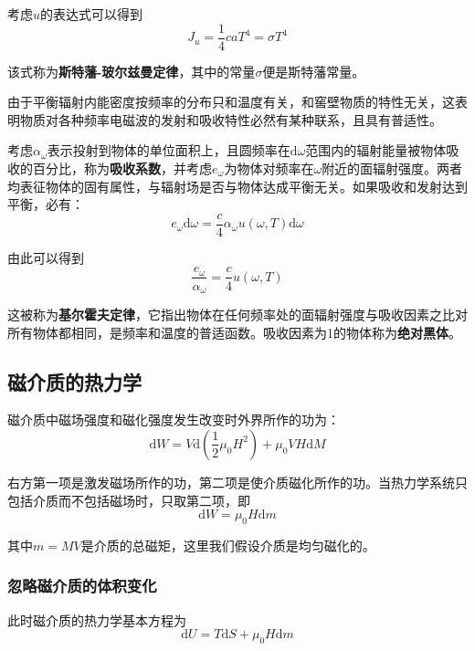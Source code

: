 \documentclass[UTF8]{ctexart}
\newcommand{\dif}{\mathrm{d}}
\begin{document}
	考虑$ u $的表达式可以得到
	\begin{equation}
		J_{u} = \frac{1}{4} c a T^{4} = \sigma T^{4}
	\end{equation}
	
\noindent 该式称为\textbf{斯特藩-玻尔兹曼定律}，其中的常量$ \sigma $便是斯特藩常量。

	由于平衡辐射内能密度按频率的分布只和温度有关，和窖壁物质的特性无关，这表明物质对各种频率电磁波的发射和吸收特性必然有某种联系，且具有普适性。
	
	考虑$ \alpha_{\omega} $表示投射到物体的单位面积上，且圆频率在$ \dif \omega $范围内的辐射能量被物体吸收的百分比，称为\textbf{吸收系数}，并考虑$ e_{\omega} $为物体对频率在$ \omega $附近的面辐射强度。两者均表征物体的固有属性，与辐射场是否与物体达成平衡无关。如果吸收和发射达到平衡，必有：
	\begin{equation}
	e_{\omega} \mathrm{d} \omega=\frac{c}{4} \alpha_{\omega} u(\omega, T) \mathrm{d} \omega
	\end{equation}
	
\noindent 由此可以得到
\begin{equation}
\frac{e_{\omega}}{\alpha_{\omega}}=\frac{c}{4} u(\omega, T)
\end{equation}

\noindent 这被称为\textbf{基尔霍夫定律}，它指出物体在任何频率处的面辐射强度与吸收因素之比对所有物体都相同，是频率和温度的普适函数。吸收因素为1的物体称为\textbf{绝对黑体}。

	\subsection{磁介质的热力学}
	磁介质中磁场强度和磁化强度发生改变时外界所作的功为：
	\begin{equation}
	\mathrm{d} W=V \mathrm{d}\left(\frac{1}{2} \mu_{0} H^{2}\right)+\mu_{0} V H \mathrm{d} M
	\end{equation}
	
\noindent 右方第一项是激发磁场所作的功，第二项是使介质磁化所作的功。当热力学系统只包括介质而不包括磁场时，只取第二项，即
\begin{equation}
\mathrm{d} W=\mu_{0} H \mathrm{d} m\label{equ_mag1}
\end{equation}

\noindent 其中$ m= MV $是介质的总磁矩，这里我们假设介质是均匀磁化的。

	\subsubsection{忽略磁介质的体积变化}
	此时磁介质的热力学基本方程为
	\begin{equation}
	\mathrm{d} U=T \mathrm{d} S+\mu_{0} H \mathrm{d} m
	\end{equation}
	
\end{document}
